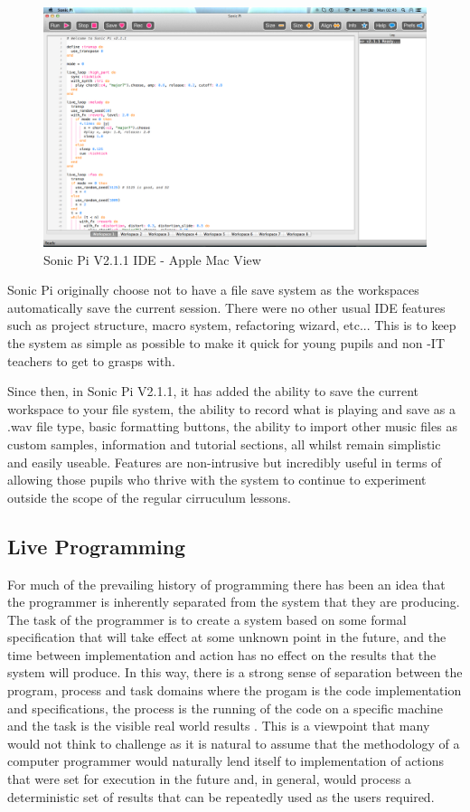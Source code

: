 \documentclass[11pt, abstracton, twoside]{scrartcl}
\begin{document}
\begin{figure}[t]
	\centering
	\includegraphics[width=\textwidth]{images/sonic-ide.png}
	\caption{Sonic Pi V2.1.1 IDE - Apple Mac View} \label{macview}
\end{figure}

Sonic Pi originally choose not to have a file save system as the workspaces 
automatically save the current session. There were no other usual IDE features 
such as project structure, macro system, refactoring wizard, etc... This is to 
keep the system as simple as possible to make it quick for young pupils and non
-IT teachers to get to grasps with.

Since then, in Sonic Pi V2.1.1, it has added the ability to save the current 
workspace to your file system, the ability to record what is playing and save 
as a .wav file type, basic formatting buttons, the ability to import other 
music files as custom samples, information and tutorial sections, all whilst 
remain simplistic and easily useable. Features are non-intrusive but 
incredibly useful in terms of allowing those pupils who thrive with the system 
to continue to experiment outside the scope of the regular cirruculum lessons.

\subsection{Live Programming}
For much of the prevailing history of programming there has been an idea that 
the programmer is inherently separated from the system that they are 
producing. The task of the programmer is to create a system based on some 
formal specification that will take effect at some unknown point in the 
future, and the time between implementation and action has no effect on the 
results that the system will produce. In this way, there is a strong sense of 
separation between the program, process and task domains where the progam is 
the code implementation and specifications, the process is the running of the 
code on a specific machine and the task is the visible real world results
\cite{SG10}. This is a viewpoint that many would not think to challenge as it 
is natural to assume that the methodology of a computer programmer would 
naturally lend itself to implementation of actions that were set for execution 
in the future and, in general, would process a deterministic set of results 
that can be repeatedly used as the users required.
\end{document}
